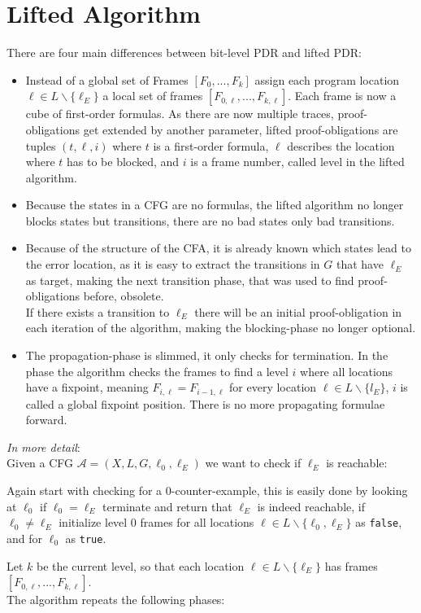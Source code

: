 \documentclass[11pt, a4paper, BCOR=10mm, ngerman]{scrbook}
\begin{document}
\section{Lifted Algorithm}
There are four main differences between bit-level PDR and lifted PDR:
\begin{itemize}

\item Instead of a global set of Frames $[F_0, ..., F_k]$ assign each program location $\ell \in L \backslash \{\ell_E\}$ a local set of frames $[F_{0, \ell}, ..., F_{k, \ell}]$. Each frame is now a cube of first-order formulas. As there are now multiple traces, proof-obligations get extended by another parameter, lifted proof-obligations are tuples $(t, \ell, i)$ where $t$ is a first-order formula, $\ell$ describes the location where $t$ has to be blocked, and $i$ is a frame number, called level in the lifted algorithm.

\item 
Because the states in a CFG are no formulas, the lifted algorithm no longer blocks states but transitions, there are no bad states only bad transitions.

\item Because of the structure of the CFA, it is already known which states lead to the error location, as it is easy to extract the transitions in $G$ that have $\ell_E$ as target, making the next transition phase, that was used to find proof-obligations before, obsolete. \\ If there exists a transition to $\ell_E$ there will be an initial proof-obligation in each iteration of the algorithm, making the blocking-phase no longer optional.

\item The propagation-phase is slimmed, it only checks for termination. In the phase the algorithm checks the frames to find a level $i$ where all locations have a fixpoint, meaning  $F_{i, \ell} = F_{i-1, \ell}$ for every location $\ell \in L \backslash \{l_E \}$, $i$ is called a global fixpoint position. There is no more propagating formulae forward.
\end{itemize}

\hspace*{5cm}

\textsl{In more detail}: \\
Given a CFG $\mathcal{A} = (X, L, G, \ell_0, \ell_E)$ we want to check if $\ell_E$ is reachable: \par
Again start with checking for a 0-counter-example, this is easily done by looking at $\ell_0$ if $\ell_0 = \ell_E$ terminate and return that $\ell_E$ is indeed reachable, if $\ell_0 \neq \ell_E$ initialize level 0 frames for all locations $\ell \in L \backslash \{\ell_0, \ell_E\}$ as \texttt{false}, and for $\ell_0$ as \texttt{true}. \par
Let $k$ be the current level, so that each location $\ell \in L \backslash \{\ell_E\}$ has frames $[F_{0, \ell}, ..., F_{k, \ell}]$. \\
The algorithm repeats the following phases: \\
\end{document}
